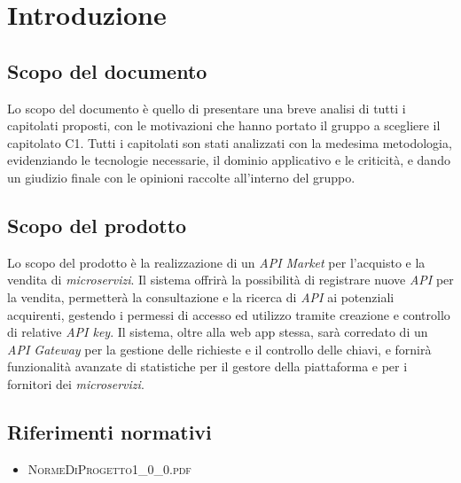\newpage
\section{Introduzione}

\subsection{Scopo del documento}
Lo scopo del documento è quello di presentare una breve analisi di tutti i capitolati proposti, con le motivazioni che hanno portato il gruppo a scegliere il capitolato C1. Tutti i capitolati son stati analizzati con la medesima metodologia,  evidenziando le tecnologie necessarie, il dominio applicativo e le criticità, e dando un giudizio finale con le opinioni raccolte all'interno del gruppo.

\subsection{Scopo del prodotto}
Lo scopo del prodotto è la realizzazione di un \textit{API Market} per l'acquisto e la vendita di \textit{microservizi}. Il sistema offrirà la possibilità di registrare nuove \textit{API} per la vendita, permetterà la consultazione e la ricerca di \textit{API} ai potenziali acquirenti, gestendo i permessi di accesso ed utilizzo tramite creazione e controllo di relative \textit{API key}. Il sistema, oltre alla web app stessa, sarà corredato di un \textit{API Gateway} per la gestione delle richieste e il controllo delle chiavi, e fornirà funzionalità avanzate di statistiche per il gestore della piattaforma e per i fornitori dei \textit{microservizi}.

\subsection{Riferimenti normativi}
\begin{itemize}
	\item \textsc{NormeDiProgetto1\_0\_0.pdf}
\end{itemize}

